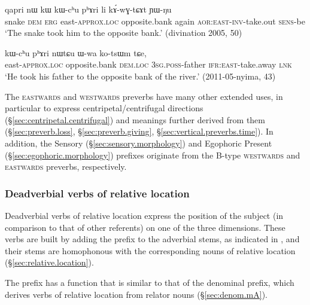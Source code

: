 \begin{exe}
\ex \label{ex:kWchu.phAri.kAwGtCAt}
\gll  qapri nɯ kɯ kɯ-cʰu pʰɤri li kɤ́-wɣ-tɕɤt ɲɯ-ŋu \\
snake \textsc{dem} \textsc{erg} east-\textsc{approx}.\textsc{loc} opposite.bank again \textsc{aor}:\textsc{east}-\textsc{inv}-take.out \textsc{sens}-be \\
\glt `The snake took him to the opposite bank.' (divination 2005, 50)
\end{exe} 

\begin{exe}
\ex \label{ex:nWtCu.kotsWm}
\gll  kɯ-cʰu pʰɤri nɯtɕu ɯ-wa ko-tsɯm tɕe, \\
east-\textsc{approx}.\textsc{loc} opposite.bank \textsc{dem}.\textsc{loc} \textsc{3sg}.\textsc{poss}-father \textsc{ifr}:\textsc{east}-take.away \textsc{lnk} \\
\glt `He took his father to the opposite bank of the river.' (2011-05-nyima, 43)
\end{exe}

The \textsc{eastwards} and \textsc{westwards} preverbs have many other extended uses, in particular to express centripetal/centrifugal directions (§\ref{sec:centripetal.centrifugal}) and meanings further derived from them (§\ref{sec:preverb.loss}, §\ref{sec:preverb.giving}, §\ref{sec:vertical.preverbs.time}). In addition, the Sensory  (§\ref{sec:sensory.morphology}) and Egophoric Present  (§\ref{sec:egophoric.morphology}) prefixes originate from the B-type \textsc{westwards} and \textsc{eastwards} preverbs, respectively.
 
\subsubsection{Deadverbial verbs of relative location} \label{sec:verbs.relative.location}
Deadverbial verbs of relative location express the position of the subject (in comparison to that of other referents) on one of the three dimensions. These verbs are built by adding the prefix  to the adverbial stems, as indicated in , and their stems are homophonous with the corresponding nouns of relative location (§\ref{sec:relative.location}).

 The  prefix has a function that is similar to that of the denominal  prefix, which derives verbs of relative location from relator nouns (§\ref{sec:denom.mA}).

